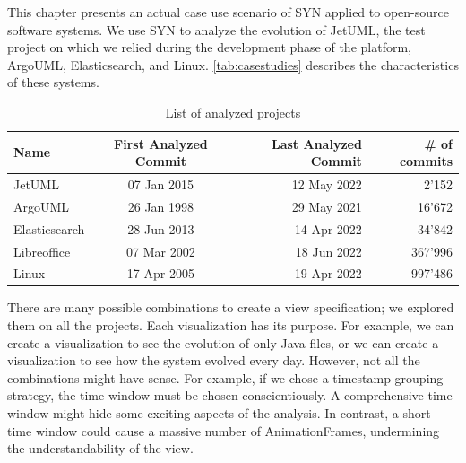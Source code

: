 This chapter presents an actual case use scenario of SYN applied to open-source software systems. 
We use SYN to analyze the evolution of JetUML, the test project on which we relied during the development phase of the platform, ArgoUML, Elasticsearch, and Linux. 
\autoref{tab:casestudies} describes the characteristics of these systems.

\begin{table}[ht]
    \centering
    \begin{tabular}{lcrr} 
        \hline
        {\bf Name} & {\bf First Analyzed Commit} & {\bf Last Analyzed Commit} & {\bf \# of commits}\\ 
        \hline
        JetUML & 07 Jan 2015 & 12 May 2022 & 2'152 \\ 
        ArgoUML & 26 Jan 1998 & 29 May 2021 & 16'672  \\
        Elasticsearch & 28 Jun 2013 & 14 Apr 2022 & 34'842  \\
        Libreoffice & 07 Mar 2002 & 18 Jun 2022 & 367'996  \\
        Linux & 17 Apr 2005 & 19 Apr 2022 & 997'486  
    \end{tabular}
    \caption{List of analyzed projects}
    \label{tab:casestudies}
\end{table}


There are many possible combinations to create a view specification; we explored them on all the projects. 
Each visualization has its purpose. For example, we can create a visualization to see the evolution of only Java files, or we can create a visualization to see how the system evolved every day. 
However, not all the combinations might have sense. For example, if we chose a timestamp grouping strategy, the time window must be chosen conscientiously. 
A comprehensive time window might hide some exciting aspects of the analysis. In contrast, a short time window could cause a massive number of AnimationFrames, undermining the understandability of the view. 

